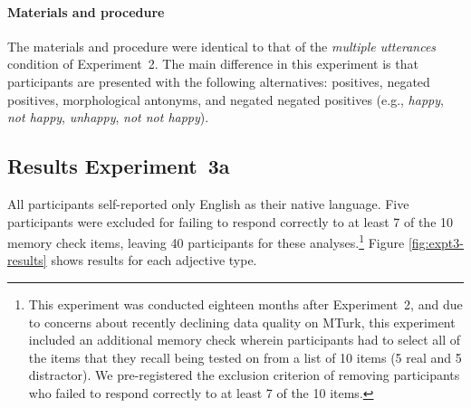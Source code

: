 \documentclass[floatsintext,doc]{apa6}
\let\oldparagraph\paragraph
\renewcommand{\paragraph}[1]{\oldparagraph{#1}\mbox{}}
\let\rmarkdownfootnote\footnote%
\def\footnote{\protect\rmarkdownfootnote}
\begin{document}
\paragraph{Materials and procedure}\label{materials-3}
The materials and procedure were identical to that of the \emph{multiple utterances} condition of Experiment~2.
The main difference in this experiment is that participants are presented with the following alternatives: positives, negated positives, morphological antonyms, and negated negated positives (e.g., \emph{happy}, \emph{not happy}, \emph{unhappy}, \emph{not not happy}).


\subsection{Results Experiment~3a}

All participants self-reported only English as their native language. Five participants were excluded for failing to respond correctly to at least 7 of the 10 memory check items, leaving 40 participants for these analyses.\footnote{This experiment was conducted eighteen months after Experiment~2, and due to concerns about recently declining data quality on MTurk, this experiment included an additional memory check wherein participants had to select all of the items that they recall being tested on from a list of 10 items (5 real and 5 distractor). 
We pre-registered the exclusion criterion of removing participants who failed to respond correctly to at least 7 of the 10 items. }
Figure \ref{fig:expt3-results} shows results for each adjective type.
\end{document}
